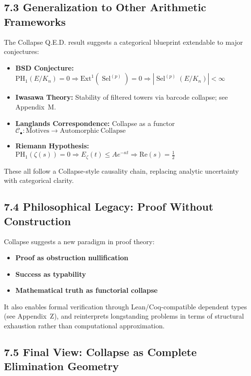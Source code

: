 \documentclass[11pt]{article}
\DeclareMathOperator{\Sel}{Sel}
\begin{document}
\subsection{7.3 Generalization to Other Arithmetic Frameworks}

The Collapse Q.E.D. result suggests a categorical blueprint extendable to major conjectures:

\begin{itemize}
  \item \textbf{BSD Conjecture:}  
  \(
  \mathrm{PH}_1(E/K_n) = 0 \Rightarrow \mathrm{Ext}^1(\Sel^{(p)}) = 0 \Rightarrow \left| \Sel^{(p)}(E/K_n) \right| < \infty
  \)

  \item \textbf{Iwasawa Theory:}  
  Stability of filtered towers via barcode collapse; see Appendix~M.

  \item \textbf{Langlands Correspondence:}  
  Collapse as a functor  
  \(
  \mathcal{C}_\bullet : \mathrm{Motives} \longrightarrow \mathrm{Automorphic\ Collapse}
  \)

  \item \textbf{Riemann Hypothesis:}  
  \(
  \mathrm{PH}_1(\zeta(s)) = 0 \Rightarrow E_\zeta(t) \leq A e^{-\kappa t} \Rightarrow \mathrm{Re}(s) = \tfrac{1}{2}
  \)
\end{itemize}

These all follow a Collapse-style causality chain, replacing analytic uncertainty with categorical clarity.

\subsection{7.4 Philosophical Legacy: Proof Without Construction}

Collapse suggests a new paradigm in proof theory:
\begin{itemize}
  \item \textbf{Proof as obstruction nullification}
  \item \textbf{Success as typability}
  \item \textbf{Mathematical truth as functorial collapse}
\end{itemize}

It also enables formal verification through Lean/Coq-compatible dependent types (see Appendix~Z), and reinterprets longstanding problems in terms of structural exhaustion rather than computational approximation.

\subsection{7.5 Final View: Collapse as Complete Elimination Geometry}
\end{document}
